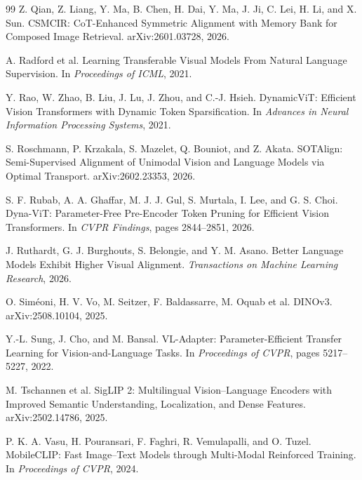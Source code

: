 \begin{thebibliography}{99}
Z. Qian, Z. Liang, Y. Ma, B. Chen, H. Dai, Y. Ma, J. Ji, C. Lei, H. Li, and
X. Sun.
\newblock CSMCIR: CoT-Enhanced Symmetric Alignment with Memory Bank for
Composed Image Retrieval.
\newblock arXiv:2601.03728, 2026.

A. Radford et al.
\newblock Learning Transferable Visual Models From Natural Language Supervision.
\newblock In \emph{Proceedings of ICML}, 2021.

Y. Rao, W. Zhao, B. Liu, J. Lu, J. Zhou, and C.-J. Hsieh.
\newblock DynamicViT: Efficient Vision Transformers with Dynamic Token
Sparsification.
\newblock In \emph{Advances in Neural Information Processing Systems}, 2021.

S. Roschmann, P. Krzakala, S. Mazelet, Q. Bouniot, and Z. Akata.
\newblock SOTAlign: Semi-Supervised Alignment of Unimodal Vision and Language
Models via Optimal Transport.
\newblock arXiv:2602.23353, 2026.

S. F. Rubab, A. A. Ghaffar, M. J. J. Gul, S. Murtala, I. Lee, and G. S. Choi.
\newblock Dyna-ViT: Parameter-Free Pre-Encoder Token Pruning for Efficient
Vision Transformers.
\newblock In \emph{CVPR Findings}, pages 2844--2851, 2026.

J. Ruthardt, G. J. Burghouts, S. Belongie, and Y. M. Asano.
\newblock Better Language Models Exhibit Higher Visual Alignment.
\newblock \emph{Transactions on Machine Learning Research}, 2026.

O. Sim\'eoni, H. V. Vo, M. Seitzer, F. Baldassarre, M. Oquab et al.
\newblock DINOv3.
\newblock arXiv:2508.10104, 2025.

Y.-L. Sung, J. Cho, and M. Bansal.
\newblock VL-Adapter: Parameter-Efficient Transfer Learning for
Vision-and-Language Tasks.
\newblock In \emph{Proceedings of CVPR}, pages 5217--5227, 2022.

M. Tschannen et al.
\newblock SigLIP 2: Multilingual Vision--Language Encoders with Improved
Semantic Understanding, Localization, and Dense Features.
\newblock arXiv:2502.14786, 2025.

P. K. A. Vasu, H. Pouransari, F. Faghri, R. Vemulapalli, and O. Tuzel.
\newblock MobileCLIP: Fast Image--Text Models through Multi-Modal Reinforced
Training.
\newblock In \emph{Proceedings of CVPR}, 2024.


\end{thebibliography}
